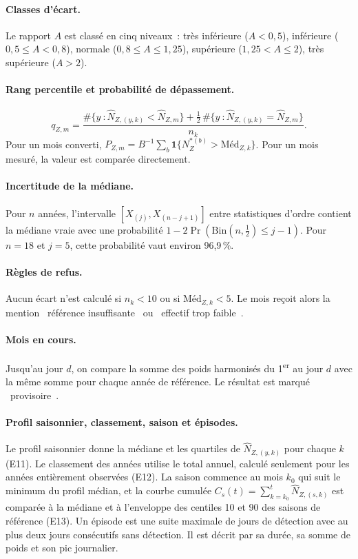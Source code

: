 \documentclass[11pt,a4paper]{article}
\newcommand{\og}{\guillemotleft~}
\newcommand{\fg}{~\guillemotright}
\begin{document}
\paragraph{Classes d'écart.} Le rapport $A$ est classé en cinq niveaux~: très inférieure ($A<0{,}5$), inférieure ($0{,}5 \le A < 0{,}8$), normale ($0{,}8 \le A \le 1{,}25$), supérieure ($1{,}25 < A \le 2$), très supérieure ($A>2$).

\paragraph{Rang percentile et probabilité de dépassement.}
\begin{equation}
  q_{Z,m} = \frac{\#\{y~: \hat N_{Z,(y,k)} < \hat N_{Z,m}\} + \tfrac12\,\#\{y~: \hat N_{Z,(y,k)} = \hat N_{Z,m}\}}{n_k}.
\end{equation}
Pour un mois converti, $P_{Z,m} = B^{-1}\sum_b \mathbf{1}\{N_Z^{\ast(b)} > \text{Méd}_{Z,k}\}$. Pour un mois mesuré, la valeur est comparée directement.

\paragraph{Incertitude de la médiane.} Pour $n$ années, l'intervalle $[X_{(j)}, X_{(n-j+1)}]$ entre statistiques d'ordre contient la médiane vraie avec une probabilité $1 - 2\Pr(\mathrm{Bin}(n,\tfrac12) \le j-1)$. Pour $n=18$ et $j=5$, cette probabilité vaut environ 96,9\,\%.

\paragraph{Règles de refus.} Aucun écart n'est calculé si $n_k < 10$ ou si $\text{Méd}_{Z,k} < 5$. Le mois reçoit alors la mention \og référence insuffisante\fg{} ou \og effectif trop faible\fg.

\paragraph{Mois en cours.} Jusqu'au jour $d$, on compare la somme des poids harmonisés du 1\textsuperscript{er} au jour $d$ avec la même somme pour chaque année de référence. Le résultat est marqué \og provisoire\fg.

\paragraph{Profil saisonnier, classement, saison et épisodes.} Le profil saisonnier donne la médiane et les quartiles de $\hat N_{Z,(y,k)}$ pour chaque $k$ (E11). Le classement des années utilise le total annuel, calculé seulement pour les années entièrement observées (E12). La saison commence au mois $k_0$ qui suit le minimum du profil médian, et la courbe cumulée $C_s(t) = \sum_{k=k_0}^{t}\hat N_{Z,(s,k)}$ est comparée à la médiane et à l'enveloppe des centiles 10 et 90 des saisons de référence (E13). Un épisode est une suite maximale de jours de détection avec au plus deux jours consécutifs sans détection. Il est décrit par sa durée, sa somme de poids et son pic journalier.
\end{document}
